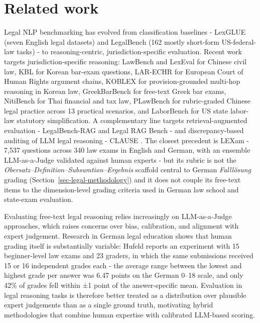 \documentclass[11pt]{article}
\begin{document}
\section{Related work}\label{related-work}

Legal NLP benchmarking has evolved from classification baselines -
LexGLUE \citep{chalkidis2022lexglue} (seven English legal datasets) and
LegalBench \citep{guha2023legalbench} (162 mostly short-form
US-federal-law tasks) - to reasoning-centric, jurisdiction-specific
evaluation. Recent work targets jurisdiction-specific reasoning:
LawBench \citep{fei2024lawbench} and LexEval \citep{li2024lexeval} for
Chinese civil law, KBL \citep{kim2024kbl} for Korean bar-exam questions,
LAR-ECHR \citep{chlapanis2024larechr} for European Court of Human Rights
argument chains, KOBLEX \citep{lee2025koblex} for provision-grounded
multi-hop reasoning in Korean law, GreekBarBench
\citep{chlapanis2025greekbarbench} for free-text Greek bar exams,
NitiBench \citep{akarajaradwong2025nitibench} for Thai financial and tax
law, PLawBench \citep{shi2026plawbench} for rubric-graded Chinese legal
practice across 13 practical scenarios, and LaborBench
\citep{hariri2025laborbench} for US state labor-law statutory
simplification. A complementary line targets retrieval-augmented
evaluation - LegalBench-RAG \citep{pipitone2024legalbenchrag} and Legal
RAG Bench \citep{butler2026legalragbench} - and discrepancy-based
auditing of LLM legal reasoning - CLAUSE \citep{choudhury2026clause}.
The closest precedent is LEXam \citep{fan2026lexam} - 7,537 questions
across 340 law exams in English and German, with an ensemble
LLM-as-a-Judge validated against human experts - but its rubric is not
the \emph{Obersatz--Definition--Subsumtion--Ergebnis} scaffold central
to German \emph{Falllösung} grading
(Section~\ref{sec-legal-methodology}) and it does not couple its
free-text items to the dimension-level grading criteria used in German
law school and state-exam evaluation.

Evaluating free-text legal reasoning relies increasingly on
LLM-as-a-Judge approaches, which raises concerns over bias, calibration,
and alignment with expert judgement. Research in German legal education
shows that human grading itself is substantially variable: Hufeld
\citep{hufeld2024} reports an experiment with 15 beginner-level law
exams and 23 graders, in which the same submissions received 15 or 16
independent grades each - the average range between the lowest and
highest grade per answer was 6.47 points on the German 0--18 scale, and
only 42\% of grades fell within ±1 point of the answer-specific mean.
Evaluation in legal reasoning tasks is therefore better treated as a
distribution over plausible expert judgements than as a single ground
truth, motivating hybrid methodologies that combine human expertise with
calibrated LLM-based scoring.
\end{document}
